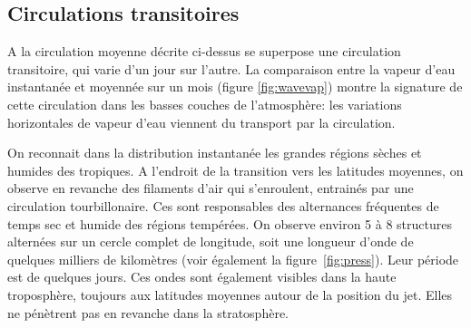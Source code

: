 
\sk
\subsection{Circulations transitoires}

\sk
A la circulation moyenne décrite ci-dessus se superpose une circulation transitoire, qui varie d'un jour sur l'autre. La comparaison entre la vapeur d'eau instantanée et moyennée sur un mois (figure \ref{fig:wavevap}) montre la signature de cette circulation dans les basses couches de l'atmosphère: les variations horizontales de vapeur d'eau viennent du transport par la circulation. 


\sk
On reconnait dans la distribution instantanée les grandes régions sèches et humides des tropiques. A l'endroit de la transition vers les latitudes moyennes, on observe en revanche des filaments d'air qui s'enroulent, entrainés par une circulation tourbillonaire. Ces  sont responsables des alternances fréquentes de temps sec et humide des régions tempérées. On observe environ 5 à 8 structures alternées sur un cercle complet de longitude, soit une longueur d'onde de quelques milliers de kilomètres (voir également la figure~\ref{fig:press}). Leur période est de quelques jours. Ces ondes sont également visibles dans la haute troposphère, toujours aux latitudes moyennes 
autour de la position du jet. Elles ne pénètrent pas en revanche dans la stratosphère.


